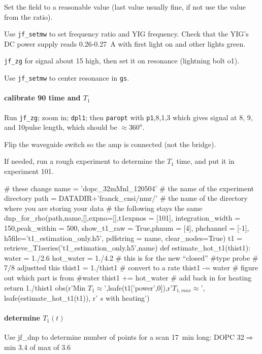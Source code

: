 Set the field to a reasonable value (last value usually fine, if not use the value from the ratio).

Use \texttt{jf\_setmw} to set frequency ratio and YIG frequency.
Check that the YIG's DC power supply reads 0.26-0.27~A with first light on and other lights green.

\texttt{jf\_zg} for signal about 15 high, then set it on resonance (lightning bolt o1).

Use \texttt{jf\_setmw} to center resonance in \texttt{gs}.

\paragraph{calibrate 90 time and $T_1$}

Run \texttt{jf_zg}; zoom in; \texttt{dpl1}; then \texttt{paropt} with \texttt{p1},8,1,3 which gives signal at 8\us, 9\us, and 10\us pulse length, which should be $\approx 360^o$.

Flip the waveguide switch so the amp is connected (not the bridge).

If needed, run a rough experiment to determine the $T_1$ time, and put it in experiment 101.

\begin{scriptsize}
\begin{python}[off]
# these change
name = 'dopc_32mMnl_120504' # the name of the experiment directory
path = DATADIR+'franck_cnsi/nmr/' # the name of the directory where you are storing your data
# the following stays the same
dnp_for_rho(path,name,[],expno=[],t1expnos = [101],
        integration_width = 150,peak_within = 500,
        show_t1_raw = True,phnum = [4],
        phchannel = [-1],
        h5file='t1_estimation_only.h5',
        pdfstring = name,
        clear_nodes=True)
t1 = retrieve_T1series('t1_estimation_only.h5',name)
def estimate_hot_t1(thist1):
    water = 1./2.6
    hot_water = 1./4.2 # this is for the new ``closed''
    #type probe # 7/8 adjustted this
    thist1 = 1./thist1 # convert to a rate
    thist1 -= water # figure out which part is from
    #water
    thist1 += hot_water # add back in for heating
    return 1./thist1
obs(r'Min $T_1\approx$',lsafe(t1['power',0]),r'\quad $T_{1,max}\approx$',
        lsafe(estimate_hot_t1(t1)),
        r' $s$ with heating')
\end{python}
\end{scriptsize}
\paragraph{determine $T_1(t)$}
Use jf\_dnp to determine number of points for a scan 17~min long:
DOPC 32\mM $\Rightarrow$ min 3.4 of max of 3.6

